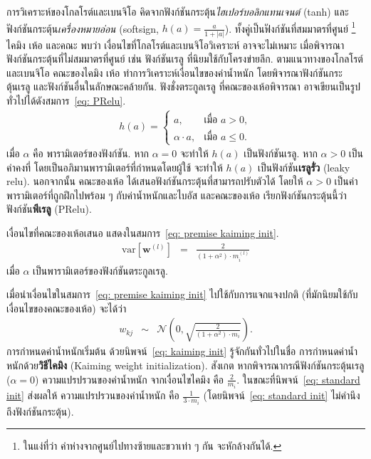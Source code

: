 การวิเคราะห์ของโกลโรต์และเบนจิโอ\cite{GlorotAISTATS2010}
คิดจากฟังก์ชันกระตุ้น\textit{ไฮเปอร์บอลิกแทนเจนต์} (tanh)
และฟังก์ชันกระตุ้น\textit{เครื่องหมายอ่อน} (softsign, $h(a) = \frac{a}{1+|a|}$).
ทั้งคู่เป็นฟังก์ชันที่สมมาตรที่ศูนย์%
\footnote{%
ในแง่ที่ว่า ค่าห่างจากศูนย์ไปทางซ้ายและขวาเท่า ๆ กัน 
จะหักล้างกันได้.
}
ไคมิง เห้อ และคณะ\cite{He2015DelvingDI}
พบว่า เงื่อนไขที่โกลโรต์และเบนจิโอวิเคราะห์
อาจจะไม่เหมาะ
เมื่อพิจารณาฟังก์ชันกระตุ้นที่ไม่สมมาตรที่ศูนย์
เช่น ฟังก์ชันเรลู ที่นิยมใช้กับโครงข่ายลึก.
ตามแนวทางของโกลโรต์และเบนจิโอ
คณะของไคมิง เห้อ\cite{He2015DelvingDI}
ทำการวิเคราะห์เงื่อนไขของค่าน้ำหนัก โดยพิจารณาฟังก์ชันกระตุ้นเรลู และฟังก์ชันอื่นในลักษณะคล้ายกัน.
ฟังชั่งตระกูลเรลู
ที่คณะของเห้อพิจารณา
อาจเขียนเป็นรูปทั่วไปได้ดังสมการ~\ref{eq: PRelu}.
\begin{eqnarray}
h(a) = \left\{\begin{array}{cc}
a, & \mbox{เมื่อ } a > 0, \\
\alpha \cdot a, & \mbox{เมื่อ } a \leq 0.
\end{array}
\right.
\label{eq: PRelu}
\end{eqnarray}
เมื่อ $\alpha$ คือ พารามิเตอร์ของฟังก์ชัน.
หาก $\alpha = 0$ 
จะทำให้ $h(a)$ เป็นฟังก์ชันเรลู.
หาก $\alpha > 0$ เป็นค่าคงที่ โดยเป็นอภิมานพารามิเตอร์ที่กำหนดโดยผู้ใช้ 
จะทำให้ $h(a)$ เป็นฟังก์ชัน\textbf{เรลูรั่ว} (leaky relu).
นอกจากนั้น
คณะของเห้อ ได้เสนอฟังก์ชันกระตุ้นที่สามารถปรับตัวได้
โดยให้ $\alpha > 0$ เป็นค่าพารามิเตอร์ที่ถูกฝึกไปพร้อม ๆ กับค่าน้ำหนักและไบอัส
และคณะของเห้อ เรียกฟังก์ชันกระตุ้นนี้ว่า 
ฟังก์ชัน\textbf{พีเรลู} (PRelu).

เงื่อนไขที่คณะของเห้อเสนอ แสดงในสมการ~\ref{eq: premise kaiming init}.
\begin{eqnarray}
\mathrm{var}[\bm{w}^{(l)}] &=& \frac{2}{(1 + \alpha^2) \cdot m_i^{(l)} }
\label{eq: premise kaiming init}
\end{eqnarray}
เมื่อ $\alpha$ เป็นพารามิเตอร์ของฟังก์ชันตระกูลเรลู.

เมื่อนำเงื่อนไขในสมการ~\ref{eq: premise kaiming init} ไปใช้กับการแจกแจงปกติ (ที่มักนิยมใช้กับเงื่อนไขของคณะของเห้อ)
จะได้ว่า
\begin{eqnarray}
w_{kj} &\sim& \mathcal{N}\left(0, \sqrt{\frac{2}{(1 + \alpha^2) \cdot m_i}}\right)
\label{eq: kaiming init}.
\end{eqnarray}
การกำหนดค่าน้ำหนักเริ่มต้น
ด้วยนิพจน์~\ref{eq: kaiming init}
รู้จักกันทั่วไปในชื่อ การกำหนดค่าน้ำหนักด้วย\textbf{วิธีไคมิง} (Kaiming weight initialization).
สังเกต หากพิจารณากรณีฟังก์ชันกระตุ้นเรลู ($\alpha = 0$)
ความแปรปรวนของค่าน้ำหนัก จากเงื่อนไขไคมิง
คือ $\frac{2}{m_i}$.
ในขณะที่นิพจน์~\ref{eq: standard init}
ส่งผลให้
ความแปรปรวนของค่าน้ำหนัก คือ
$\frac{1}{3 \cdot m_i}$ (โดยนิพจน์~\ref{eq: standard init} ไม่คำนึงถึงฟังก์ชันกระตุ้น).

